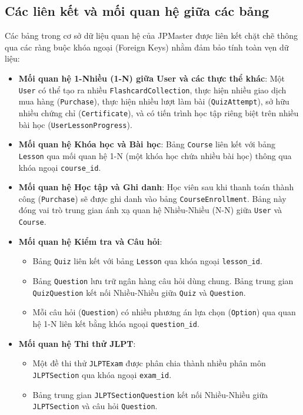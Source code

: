 \documentclass[../DoAn.tex]{subfiles}
\begin{document}
\subsection{Các liên kết và mối quan hệ giữa các bảng}

Các bảng trong cơ sở dữ liệu quan hệ của JPMaster được liên kết chặt chẽ thông qua các ràng buộc khóa ngoại (Foreign Keys) nhằm đảm bảo tính toàn vẹn dữ liệu:
\begin{itemize}
    \item \textbf{Mối quan hệ 1-Nhiều (1-N) giữa User và các thực thể khác}: Một \texttt{User} có thể tạo ra nhiều \texttt{FlashcardCollection}, thực hiện nhiều giao dịch mua hàng (\texttt{Purchase}), thực hiện nhiều lượt làm bài (\texttt{QuizAttempt}), sở hữu nhiều chứng chỉ (\texttt{Certificate}), và có tiến trình học tập riêng biệt trên nhiều bài học (\texttt{UserLessonProgress}).
    \item \textbf{Mối quan hệ Khóa học và Bài học}: Bảng \texttt{Course} liên kết với bảng \texttt{Lesson} qua mối quan hệ 1-N (một khóa học chứa nhiều bài học) thông qua khóa ngoại \texttt{course\_id}.
    \item \textbf{Mối quan hệ Học tập và Ghi danh}: Học viên sau khi thanh toán thành công (\texttt{Purchase}) sẽ được ghi danh vào bảng \texttt{CourseEnrollment}. Bảng này đóng vai trò trung gian ánh xạ quan hệ Nhiều-Nhiều (N-N) giữa \texttt{User} và \texttt{Course}.
    \item \textbf{Mối quan hệ Kiểm tra và Câu hỏi}: 
        \begin{itemize}
            \item Bảng \texttt{Quiz} liên kết với bảng \texttt{Lesson} qua khóa ngoại \texttt{lesson\_id}.
            \item Bảng \texttt{Question} lưu trữ ngân hàng câu hỏi dùng chung. Bảng trung gian \texttt{QuizQuestion} kết nối Nhiều-Nhiều giữa \texttt{Quiz} và \texttt{Question}.
            \item Mỗi câu hỏi (\texttt{Question}) có nhiều phương án lựa chọn (\texttt{Option}) qua quan hệ 1-N liên kết bằng khóa ngoại \texttt{question\_id}.
        \end{itemize}
    \item \textbf{Mối quan hệ Thi thử JLPT}:
        \begin{itemize}
            \item Một đề thi thử \texttt{JLPTExam} được phân chia thành nhiều phân môn \texttt{JLPTSection} qua khóa ngoại \texttt{exam\_id}.
            \item Bảng trung gian \texttt{JLPTSectionQuestion} kết nối Nhiều-Nhiều giữa \texttt{JLPTSection} và câu hỏi \texttt{Question}.

\end{itemize}
\end{itemize}
\end{document}
